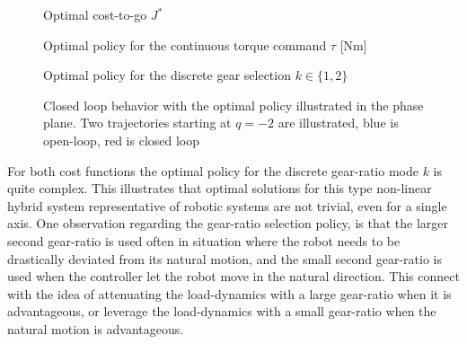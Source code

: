 \begin{figure}[p]
        \centering
        \caption{Optimal cost-to-go $J^*$}\label{fig:J}
\end{figure}

\begin{figure}[p]
        \centering
        \caption{Optimal policy for the continuous torque command $\tau$ [Nm]}\label{fig:u0}
\end{figure}

\begin{figure}[p]
        \centering
        \caption{Optimal policy for the discrete gear selection $k \in \{1,2\}$}\label{fig:u1}
\end{figure}

\begin{figure}[p]
        \centering
        \caption[Closed loop behavior in the phase plane]{Closed loop behavior with the optimal policy illustrated in the phase plane. Two trajectories starting at $q=-2$ are illustrated, blue is open-loop, red is closed loop}\label{fig:phase_plane}
\end{figure}

For both cost functions the optimal policy for the discrete gear-ratio mode $k$ is quite complex. This illustrates that optimal solutions for this type non-linear hybrid system representative of robotic systems are not trivial, even for a single axis. One observation regarding the gear-ratio selection policy, is that the larger second gear-ratio is used often in situation where the robot needs to be drastically deviated from its natural motion, and the small second gear-ratio is used when the controller let the robot move in the natural direction. This connect with the idea of attenuating the load-dynamics with a large gear-ratio when it is advantageous, or leverage the load-dynamics with a small gear-ratio when the natural motion is advantageous. 




